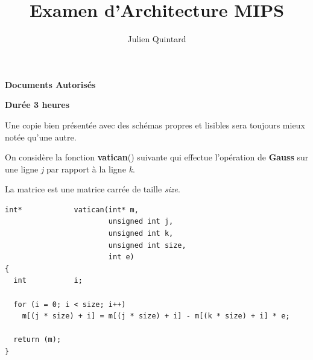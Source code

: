 
%
%



%
%


%
%

\title{Examen d'Architecture MIPS}

%
%

\author{\small{Julien Quintard}}

%
%



%
%

\maketitle

%
%

\begin{center}

\textbf{Documents Autoris\'es}

\textbf{Dur\'ee 3 heures}

\scriptsize{Une copie bien pr\'esent\'ee avec des sch\'emas propres et
	    lisibles sera toujours mieux not\'ee qu'une autre.}
\end{center}

%
%

On consid\`ere la fonction \textbf{vatican}() suivante qui effectue
l'op\'eration de \textbf{Gauss} sur une ligne \textit{j} par rapport \`a
la ligne \textit{k}.

La matrice est une matrice carr\'ee de taille \textit{size}.

\begin{verbatim}
int*            vatican(int* m,
                        unsigned int j,
                        unsigned int k,
                        unsigned int size,
                        int e)
{
  int           i;

  for (i = 0; i < size; i++)
    m[(j * size) + i] = m[(j * size) + i] - m[(k * size) + i] * e;

  return (m);
}
\end{verbatim}

